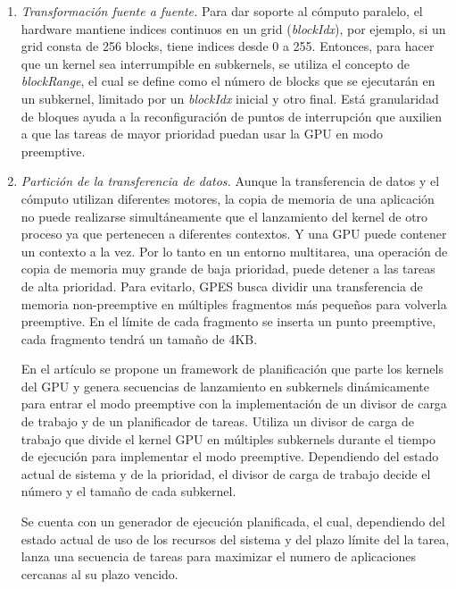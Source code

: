 \begin{enumerate}
	\item \textit{Transformación fuente a fuente.}
	Para dar soporte al cómputo paralelo, el hardware mantiene indices continuos en un grid (\textit{blockIdx}), por ejemplo, si un grid consta de 256 blocks, tiene indices desde 0 a 255. Entonces, para hacer que un kernel sea interrumpible en subkernels, se utiliza el concepto de \textit{blockRange}, el cual se define como el número de blocks que se ejecutarán en un subkernel, limitado por un \textit{blockIdx} inicial y otro final. Está granularidad de bloques ayuda a la reconfiguración de puntos de interrupción que auxilien a que las tareas de mayor prioridad puedan usar la GPU en modo preemptive.

	\item \textit{Partición de la transferencia de datos.}
	Aunque la transferencia de datos y el cómputo utilizan diferentes motores, la copia de memoria de una aplicación no puede realizarse simultáneamente que el lanzamiento del kernel de otro proceso ya que pertenecen a diferentes contextos. Y una GPU puede contener un contexto a la vez. Por lo tanto en un entorno multitarea, una operación de copia de memoria muy grande de baja prioridad, puede detener a las tareas de alta prioridad. Para evitarlo, GPES busca dividir una transferencia de memoria non-preemptive en múltiples fragmentos más pequeños para volverla preemptive. En el límite de cada fragmento se inserta un punto preemptive, cada fragmento tendrá un tamaño de 4KB.


En el artículo \cite{RTFG} se propone un framework de planificación que parte los kernels del GPU y genera secuencias de lanzamiento en subkernels dinámicamente para entrar el modo preemptive con la implementación de un divisor de carga de trabajo y de un planificador de tareas. Utiliza un divisor de carga de trabajo que divide el kernel GPU en múltiples subkernels durante el tiempo de ejecución para implementar el modo preemptive. Dependiendo del estado actual de sistema y de la prioridad, el divisor de carga de trabajo decide el número y el tamaño de cada subkernel. 

\vspace{0.3cm}

Se cuenta con un generador de ejecución planificada, el cual, dependiendo del estado actual de uso de los recursos del sistema y del plazo límite del la tarea, lanza una secuencia de tareas para maximizar el numero de aplicaciones cercanas al su plazo vencido.	


\end{enumerate}
